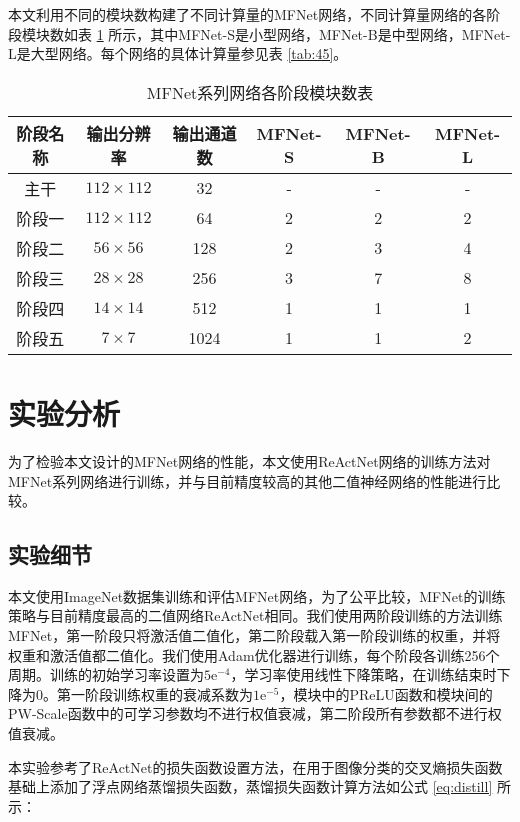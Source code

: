 本文利用不同的模块数构建了不同计算量的MFNet网络，不同计算量网络的各阶段模块数如表 \ref{tab:41} 所示，其中MFNet-S是小型网络，MFNet-B是中型网络，MFNet-L是大型网络。每个网络的具体计算量参见表 \ref{tab:45}。

\begin{table}[h]
  \vspace{6pt}
  \centering
  \caption{MFNet系列网络各阶段模块数表}
  \label{tab:41}
  \begin{tabular}{cccccc}
    \toprule
    阶段名称 & 输出分辨率 & 输出通道数 & MFNet-S & MFNet-B & MFNet-L  \\
    \midrule
    主干  & $112\times112$ & 32 & - & - & - \\
    阶段一 & $112\times112$ & 64 & 2 & 2 & 2 \\
    阶段二 & $56\times56$ & 128  & 2 & 3 & 4 \\
    阶段三 & $28\times28$ & 256  & 3 & 7 & 8 \\
    阶段四 & $14\times14$ & 512  & 1 & 1 & 1 \\
    阶段五 & $7\times7$ & 1024   & 1 & 1 & 2  \\
    \bottomrule
  \end{tabular}
  \vspace{6pt}
\end{table}

\section{实验分析}

为了检验本文设计的MFNet网络的性能，本文使用ReActNet\cite{reactnet}网络的训练方法对MFNet系列网络进行训练，并与目前精度较高的其他二值神经网络的性能进行比较。

\subsection{实验细节}

本文使用ImageNet数据集训练和评估MFNet网络，为了公平比较，MFNet的训练策略与目前精度最高的二值网络ReActNet\cite{reactnet}相同。我们使用两阶段训练的方法训练MFNet，第一阶段只将激活值二值化，第二阶段载入第一阶段训练的权重，并将权重和激活值都二值化。我们使用Adam优化器进行训练，每个阶段各训练256个周期。训练的初始学习率设置为$5\text{e}^{-4}$，学习率使用线性下降策略，在训练结束时下降为0。第一阶段训练权重的衰减系数为$1\text{e}^{-5}$，模块中的PReLU函数和模块间的PW-Scale函数中的可学习参数均不进行权值衰减，第二阶段所有参数都不进行权值衰减。

本实验参考了ReActNet\cite{reactnet}的损失函数设置方法，在用于图像分类的交叉熵损失函数基础上添加了浮点网络蒸馏损失函数，蒸馏损失函数计算方法如公式 \eqref{eq:distill} 所示：

